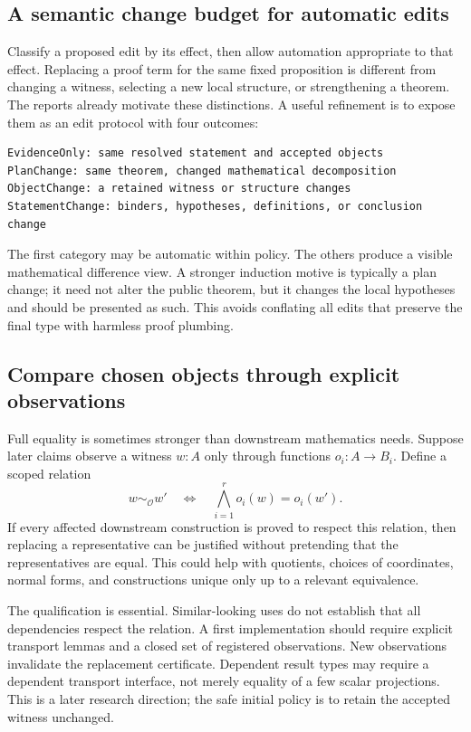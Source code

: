 \documentclass[11pt,letterpaper]{article}
\begin{document}
\subsection{A semantic change budget for automatic edits}
Classify a proposed edit by its effect, then allow automation appropriate to that
effect. Replacing a proof term for the same fixed proposition is different from
changing a witness, selecting a new local structure, or strengthening a theorem.
The reports already motivate these distinctions. A useful refinement is to expose
them as an edit protocol with four outcomes:
\begin{lstlisting}
EvidenceOnly: same resolved statement and accepted objects
PlanChange: same theorem, changed mathematical decomposition
ObjectChange: a retained witness or structure changes
StatementChange: binders, hypotheses, definitions, or conclusion change
\end{lstlisting}
The first category may be automatic within policy. The others produce a visible
mathematical difference view. A stronger induction motive is typically a plan
change; it need not alter the public theorem, but it changes the local hypotheses
and should be presented as such. This avoids conflating all edits that preserve the
final type with harmless proof plumbing.

\subsection{Compare chosen objects through explicit observations}
Full equality is sometimes stronger than downstream mathematics needs. Suppose
later claims observe a witness \(w:A\) only through functions \(o_i:A\to B_i\).
Define a scoped relation
\[
 w\sim_{\mathcal O}w'\quad\Longleftrightarrow\quad
 \bigwedge_{i=1}^{r}o_i(w)=o_i(w').
\]
If every affected downstream construction is proved to respect this relation,
then replacing a representative can be justified without pretending that the
representatives are equal. This could help with quotients, choices of coordinates,
normal forms, and constructions unique only up to a relevant equivalence.

The qualification is essential. Similar-looking uses do not establish that all
dependencies respect the relation. A first implementation should require explicit
transport lemmas and a closed set of registered observations. New observations
invalidate the replacement certificate. Dependent result types may require a
dependent transport interface, not merely equality of a few scalar projections.
This is a later research direction; the safe initial policy is to retain the
accepted witness unchanged.
\end{document}
